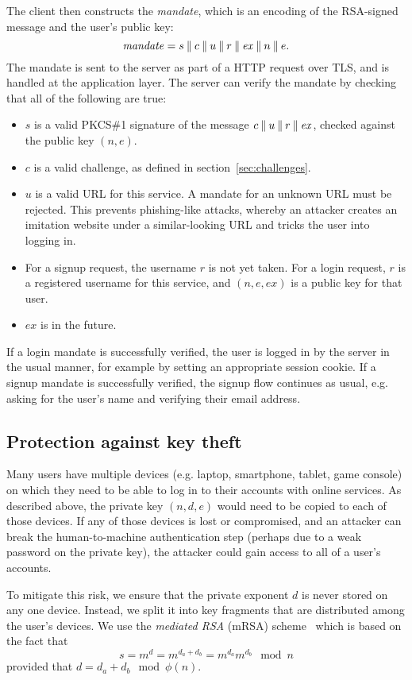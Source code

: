 The client then constructs the \emph{mandate}, which is an encoding of the RSA-signed message and
the user's public key: $$\mathit{mandate} = s \mathbin{\|} c \mathbin{\|} u \mathbin{\|} r \mathbin{\|} \mathit{ex} \mathbin{\|} n \mathbin{\|} e.$$
The mandate is sent to the server as part of a HTTP request over TLS, and is handled at the
application layer. The server can verify the mandate by checking that all of the following are true:
\begin{itemize}
\item $s$ is a valid PKCS\#1 signature of the message $c \mathbin{\|} u \mathbin{\|} r \mathbin{\|} \mathit{ex}$,
checked against the public key $(n, e)$.
\item $c$ is a valid challenge, as defined in section~\ref{sec:challenges}.
\item $u$ is a valid URL for this service. A mandate for an unknown URL must be rejected. This
prevents phishing-like attacks, whereby an attacker creates an imitation website under a
similar-looking URL and tricks the user into logging in.
\item For a signup request, the username $r$ is not yet taken. For a login request, $r$ is a
registered username for this service, and $(n, e, \mathit{ex})$ is a public key for that user.
\item $\mathit{ex}$ is in the future.
\end{itemize}

If a login mandate is successfully verified, the user is logged in by the server in the usual
manner, for example by setting an appropriate session cookie. If a signup mandate is successfully
verified, the signup flow continues as usual, e.g. asking for the user's name and verifying their
email address.

\subsection{Protection against key theft}\label{sec:revocation}

Many users have multiple devices (e.g. laptop, smartphone, tablet, game console) on which they need
to be able to log in to their accounts with online services. As described above, the private key
$(n, d, e)$ would need to be copied to each of those devices. If any of those devices is lost or
compromised, and an attacker can break the human-to-machine authentication step (perhaps due to a
weak password on the private key), the attacker could gain access to all of a user's accounts.

To mitigate this risk, we ensure that the private exponent $d$ is never stored on any one device.
Instead, we split it into key fragments that are distributed among the user's devices. We use the
\emph{mediated RSA} (mRSA) scheme~\cite{Boneh01, Kutyiowski12} which is based on the fact that
$$s = m^d = m^{d_a + d_b} = m^{d_a} m^{d_b} \mod n$$ provided that $d = d_a + d_b \mod \phi(n)$.

